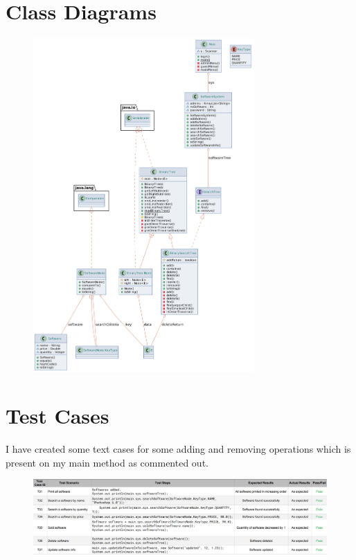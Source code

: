 \documentclass[a4paper]{article}
\begin{document}
\begin{large}
  \vspace{1em}


  \newpage

  \section{Class Diagrams}

  \begin{figure}[htp]
    \centering
    \includegraphics[width=0.75\textwidth]{class-diagram}
  \end{figure}

  \newpage

  \section{Test Cases}

  I have created some text cases for some adding and removing operations which is present on my main method as commented out.

  \begin{figure}[htp]
    \centering
    \hspace*{-2cm}
    \includegraphics[width=1.25\textwidth]{test}
  \end{figure}


\end{large}
\end{document}
